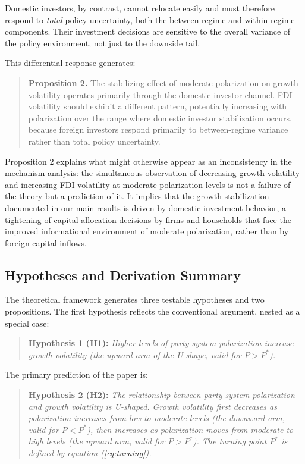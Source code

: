 \documentclass[12pt]{article}
\begin{document}
Domestic investors, by contrast, cannot relocate easily and must therefore
respond to \textit{total} policy uncertainty, both the between-regime
and within-regime components. Their investment decisions are sensitive to
the overall variance of the policy environment, not just to the downside
tail.

This differential response generates:

\begin{quote}
\textbf{Proposition 2.} The stabilizing effect of moderate polarization
on growth volatility operates primarily through the domestic investor
channel. FDI volatility should exhibit a different pattern, potentially
increasing with polarization over the range where domestic investor
stabilization occurs, because foreign investors respond primarily to
between-regime variance rather than total policy uncertainty.
\end{quote}

\noindent Proposition 2 explains what might otherwise appear as an
inconsistency in the mechanism analysis: the simultaneous observation of
decreasing growth volatility and increasing FDI volatility at moderate
polarization levels is not a failure of the theory but a prediction of it.
It implies that the growth stabilization documented in our main results
is driven by domestic investment behavior, a tightening of capital
allocation decisions by firms and households that face the improved
informational environment of moderate polarization, rather than by
foreign capital inflows.

\subsection{Hypotheses and Derivation Summary}

The theoretical framework generates three testable hypotheses and two
propositions. The first hypothesis reflects the conventional argument,
nested as a special case:

\begin{quote}
\textbf{Hypothesis 1 (H1):} \textit{Higher levels of party system
polarization increase growth volatility (the upward arm of the
U-shape, valid for $P > P^*$).}
\end{quote}

\noindent The primary prediction of the paper is:

\begin{quote}
\textbf{Hypothesis 2 (H2):} \textit{The relationship between party system
polarization and growth volatility is U-shaped. Growth volatility first
decreases as polarization increases from low to moderate levels (the
downward arm, valid for $P < P^*$), then increases as polarization moves
from moderate to high levels (the upward arm, valid for $P > P^*$). The
turning point $P^*$ is defined by equation (\ref{eq:turning}).}
\end{quote}
\end{document}
